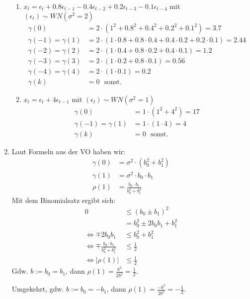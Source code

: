 \documentclass[a4paper,11pt,notitlepage,fullpage]{article}
\begin{document}
\begin{enumerate}
\begin{enumerate}
\item $x_t = \epsilon_t + 0.8 \epsilon_{t-1} - 0.4 \epsilon_{t-2} + 0.2 \epsilon_{t-3} - 0.1 \epsilon_{t-4}$ mit $(\epsilon_t) \sim WN(\sigma^2 = 2)$
\begin{align*}
\gamma(0) &= 2 \cdot (1^2 + 0.8^2 + 0.4^2 + 0.2^2 + 0.1^2) = 3.7 \\
\gamma(-1) = \gamma(1) &= 2 \cdot (1 \cdot 0.8+ 0.8 \cdot 0.4 + 0.4 \cdot 0.2 + 0.2 \cdot 0.1) = 2.44 \\
\gamma(-2) = \gamma(2) &= 2 \cdot (1 \cdot 0.4+ 0.8 \cdot 0.2 + 0.4 \cdot 0.1) = 1.2 \\
\gamma(-3) = \gamma(3) &= 2 \cdot (1 \cdot 0.2+ 0.8 \cdot 0.1) = 0.56 \\
\gamma(-4) = \gamma(4) &= 2 \cdot (1 \cdot 0.1) = 0.2 \\
\gamma(k) &= 0~~~\text{sonst.}
\end{align*}

\item $x_t = \epsilon_t + 4 \epsilon_{t-1}$ mit $(\epsilon_t) \sim WN(\sigma^2 = 1)$
\begin{align*}
\gamma(0) &= 1 \cdot (1^2 + 4^2) = 17 \\
\gamma(-1) = \gamma(1) &= 1 \cdot (1 \cdot 4) = 4 \\
\gamma(k) &= 0~~~\text{sonst.}
\end{align*}
\end{enumerate}

\item Laut Formeln aus der VO haben wir:
\begin{align*}
\gamma(0) &= \sigma^2 \cdot (b_0^2 + b_1^2) \\
\gamma(1) &= \sigma^2 \cdot b_0 \cdot b_1 \\
\rho(1) &= \frac{b_0 \cdot b_1}{b_0^2 + b_1^2}
\end{align*}
Mit dem Binomialsatz ergibt sich:
\begin{align*}
0 &\leq (b_0 \pm b_1)^2 \\
&= b_0^2 \pm 2b_0b_1 + b_1^2 \\
\Leftrightarrow \mp 2b_0b_1 &\leq b_0^2 + b_1^2 \\
\Leftrightarrow \mp \frac{b_0 \cdot b_1}{b_0^2 + b_1^2} &\leq \frac{1}{2} \\
\Leftrightarrow |\rho(1)| &\leq \frac{1}{2}
\end{align*}
Gdw. $b := b_0 = b_1$, dann $\rho(1) = \frac{b^2}{2b^2} = \frac{1}{2}$.

Umgekehrt, gdw. $b := b_0 = -b_1$, dann $\rho(1) = \frac{-b^2}{2b^2} = -\frac{1}{2}$.


\end{enumerate}
\end{document}
